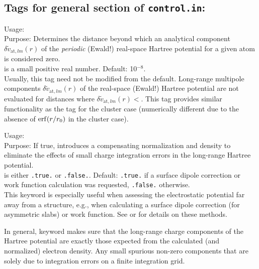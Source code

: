 \newpage



\subsection*{Tags for general section of \texttt{control.in}:}

{
  \noindent
  Usage:   \\[1.0ex]
  Purpose: Determines the distance beyond which an analytical
    component $\delta\tilde{v}_{\text{at},lm}(r)$ of the
    \emph{periodic} (Ewald!) real-space Hartree 
    potential for a given atom is considered zero. \\[1.0ex]
   is a small positive real number. Default:
    10$^{-8}$. \\
}
Usually, this tag need not be modified from the default. Long-range
multipole components $\delta\tilde{v}_{\text{at},lm}(r)$ of the
real-space (Ewald!) Hartree potential are not evaluated for distances
where $\delta\tilde{v}_{\text{at},lm}(r)<$. This tag
provides similar functionality as the  tag
for the cluster case (numerically different due to the absence of
$\mathop{\mathrm{erf}}(r/r_0)$ in the cluster case).

{
  \noindent
  Usage:   \\[1.0ex]
  Purpose: If true, introduces a compensating normalization and 
    density to eliminate the effects of small charge integration errors 
    in the long-range Hartree potential. \\[1.0ex]
   is either \texttt{.true.} or \texttt{.false.}. Default:
    \texttt{.true.} if a surface dipole correction or work function calculation
    was requested, \texttt{.false.} otherwise. \\
}
This keyword is especially useful when assessing the electrostatic potential
far away from a structure, e.g., when calculating a surface dipole correction 
(for asymmetric slabs) or work function. 
See  or  for
details on these methods.

In general, keyword  makes sure that the
long-range charge components of the Hartree potential are exactly those expected 
from the calculated (and normalized) electron density. Any small spurious non-zero
components that are solely due to integration errors on a finite integration grid.


